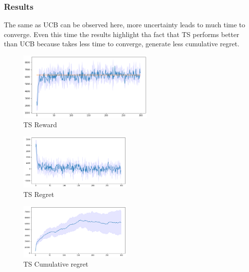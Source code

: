\subsubsection{Results}
The same as UCB can be observed here, more uncertainty leads to much time to converge. Even this time the results highlight tha fact that TS performs better than UCB because takes less time to converge, generate less cumulative regret.
\begin{figure}[ht]
    \begin{center}
    \includegraphics[width=0.6\textwidth]{img/TS4.png}
    \caption{TS Reward}
    \label{fig:reward42}
    \end{center}
\end{figure}
\begin{multicols}{2}
    \begin{figure}[H]
        \begin{center}
        \includegraphics[width=0.5\textwidth]{img/TS4_regret.png}
        \caption{TS Regret}
        \label{fig:regret42}
        \end{center}
    \end{figure}
    \columnbreak
    \begin{figure}[H]
        \begin{center}
        \includegraphics[width=0.5\textwidth]{img/TS4_cum_reg.png}
        \caption{TS Cumulative regret}
        \label{fig:cum_reg42}
        \end{center}
    \end{figure}
\end{multicols}
